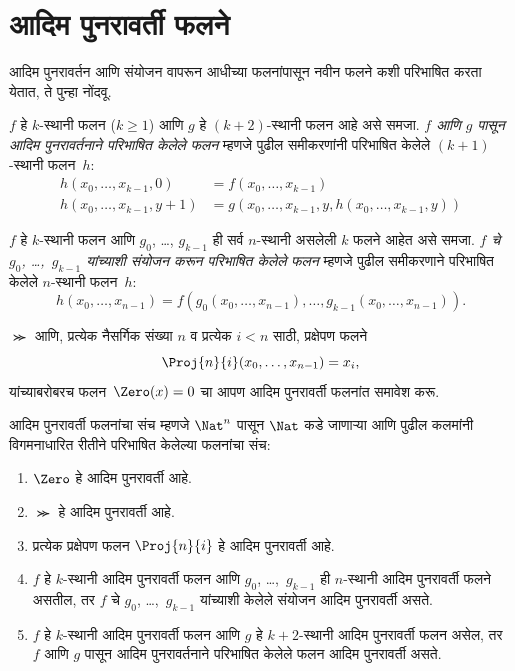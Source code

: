 \section{आदिम पुनरावर्ती फलने}\label{cmp:rec:prf:sec}

आदिम पुनरावर्तन आणि संयोजन वापरून आधीच्या फलनांपासून नवीन फलने कशी
परिभाषित करता येतात, ते पुन्हा नोंदवू.

\begin{defn}
  \label{cmp:rec:prf:defn:primitive-recursion} $f$ हे $k$-स्थानी फलन ($k\ge 1$)
  आणि $g$ हे $(k+2)$-स्थानी फलन आहे असे समजा. \emph{$f$ आणि $g$ पासून
  आदिम पुनरावर्तनाने परिभाषित केलेले फलन} म्हणजे पुढील समीकरणांनी परिभाषित
  केलेले $(k+1)$-स्थानी फलन~$h$:
  \begin{align*}
    h(x_0,\dots,x_{k-1},0) & =  f(x_0,\dots,x_{k-1}) \\
    h(x_0,\dots,x_{k-1},y+1) & = g(x_0,\dots,x_{k-1}, y, h(x_0,\dots,x_{k-1}, y))
  \end{align*}
\end{defn}

\begin{defn}
  \label{cmp:rec:prf:defn:composition} $f$ हे $k$-स्थानी फलन आणि $g_0$, \dots,
  $g_{k-1}$ ही सर्व $n$-स्थानी असलेली $k$ फलने आहेत असे समजा.
  \emph{$f$ चे $g_0$, \dots,~$g_{k-1}$ यांच्याशी संयोजन करून परिभाषित
    केलेले फलन} म्हणजे पुढील समीकरणाने परिभाषित केलेले $n$-स्थानी
  फलन~$h$:
  \[  h(x_0, \dots, x_{n-1}) =
  f(g_0(x_0, \dots, x_{n-1}), \dots, g_{k-1}(x_0, \dots, x_{n-1})).
  \]
\end{defn}

$\Succ$ आणि, प्रत्येक नैसर्गिक संख्या $n$ व प्रत्येक $i < n$ साठी,
प्रक्षेपण फलने
\[\Proj{n}{i}(x_0,\dots,x_{n-1}) = x_i,
\]
यांच्याबरोबरच फलन~$\Zero(x) = 0$ चा आपण आदिम पुनरावर्ती फलनांत
समावेश करू.

\begin{defn}
  आदिम पुनरावर्ती फलनांचा संच म्हणजे $\Nat^n$ पासून $\Nat$ कडे जाणाऱ्या
  आणि पुढील कलमांनी विगमनाधारित रीतीने परिभाषित केलेल्या फलनांचा संच:
  \begin{enumerate}
  \item $\Zero$ हे आदिम पुनरावर्ती आहे.
  \item $\Succ$ हे आदिम पुनरावर्ती आहे.
  \item प्रत्येक प्रक्षेपण फलन $\Proj{n}{i}$ हे आदिम पुनरावर्ती आहे.
  \item $f$ हे $k$-स्थानी आदिम पुनरावर्ती फलन आणि $g_0$,
    \dots,~$g_{k-1}$ ही $n$-स्थानी आदिम पुनरावर्ती फलने असतील, तर
    $f$ चे $g_0$, \dots,~$g_{k-1}$ यांच्याशी केलेले संयोजन आदिम
    पुनरावर्ती असते.
  \item $f$ हे $k$-स्थानी आदिम पुनरावर्ती फलन आणि $g$ हे $k+2$-स्थानी
    आदिम पुनरावर्ती फलन असेल, तर $f$ आणि $g$ पासून आदिम पुनरावर्तनाने
    परिभाषित केलेले फलन आदिम पुनरावर्ती असते.
\end{enumerate}
\end{defn}

